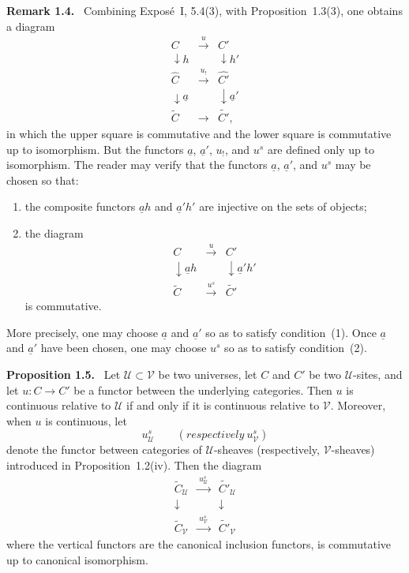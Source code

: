\documentclass[11pt]{article}
\newcommand{\U}{\mathcal{U}}
\newcommand{\V}{\mathcal{V}}
\newcommand{\resp}{respectively}
\newenvironment{statement}[1]{\par\medskip\noindent\textbf{#1.}\ }{\par\medskip}
\newenvironment{remarktext}[1]{\par\medskip\noindent\textbf{#1.}\ }{\par\medskip}
\begin{document}
\begin{remarktext}{Remark 1.4}
Combining Expos\'e~I, 5.4(3), with Proposition~1.3(3), one obtains a diagram
\[
\begin{array}{ccccc}
C&\xrightarrow{\ u\ }&C'\\
\downarrow{\scriptstyle h}&&\downarrow{\scriptstyle h'}\\
\widehat C&\xrightarrow{\ u_!\ }&\widehat {C'}\\
\downarrow{\scriptstyle\underline a}&&\downarrow{\scriptstyle\underline a'}\\
\widetilde C&\xrightarrow{}&\widetilde {C'},
\end{array}
\]
in which the upper square is commutative and the lower square is commutative up to isomorphism. But the functors \(\underline a\), \(\underline a'\), \(u_!\), and \(u^s\) are defined only up to isomorphism. The reader may verify that the functors \(\underline a\), \(\underline a'\), and \(u^s\) may be chosen so that:
\begin{enumerate}[label=\arabic*)]
\item the composite functors \(\underline ah\) and \(\underline a'h'\) are injective on the sets of objects;
\item the diagram
\[
\begin{array}{ccc}
C&\xrightarrow{\ u\ }&C'\\
\downarrow{\scriptstyle\underline ah}&&\downarrow{\scriptstyle\underline a'h'}\\
\widetilde C&\xrightarrow{\ u^s\ }&\widetilde {C'}
\end{array}
\]
is commutative.
\end{enumerate}
More precisely, one may choose \(\underline a\) and \(\underline a'\) so as to satisfy condition~(1). Once \(\underline a\) and \(\underline a'\) have been chosen, one may choose \(u^s\) so as to satisfy condition~(2).
\end{remarktext}

\begin{statement}{Proposition 1.5}
Let \(\U\subset \V\) be two universes, let \(C\) and \(C'\) be two \(\U\)-sites, and let \(u:C\to C'\) be a functor between the underlying categories. Then \(u\) is continuous relative to \(\U\) if and only if it is continuous relative to \(\V\). Moreover, when \(u\) is continuous, let
\[
u^s_{\U}\qquad(\resp\ u^s_{\V})
\]
denote the functor between categories of \(\U\)-sheaves (respectively, \(\V\)-sheaves) introduced in Proposition~1.2(iv). Then the diagram
\[
\begin{array}{ccc}
\widetilde C_{\U}&\xrightarrow{\ u^s_{\U}\ }&\widetilde {C'}_{\U}\\
\downarrow&&\downarrow\\
\widetilde C_{\V}&\xrightarrow{\ u^s_{\V}\ }&\widetilde {C'}_{\V}
\end{array}
\tag{1.5.1}
\]
where the vertical functors are the canonical inclusion functors, is commutative up to canonical isomorphism.
\end{statement}
\end{document}
